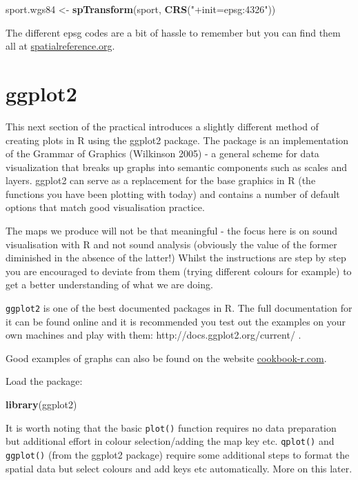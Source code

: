 \documentclass[]{article}
\newenvironment{Shaded}{}{}
\newcommand{\KeywordTok}[1]{\textcolor[rgb]{0.00,0.44,0.13}{\textbf{{#1}}}}
\newcommand{\StringTok}[1]{\textcolor[rgb]{0.25,0.44,0.63}{{#1}}}
\newcommand{\NormalTok}[1]{{#1}}
\begin{document}
\begin{Shaded}
\begin{Highlighting}[]
\NormalTok{sport.wgs84 <- }\KeywordTok{spTransform}\NormalTok{(sport, }\KeywordTok{CRS}\NormalTok{(}\StringTok{"+init=epsg:4326"}\NormalTok{))}
\end{Highlighting}
\end{Shaded}
The different epsg codes are a bit of hassle to remember but you can
find them all at
\href{http://spatialreference.org/}{spatialreference.org}.

\section{ggplot2}

This next section of the practical introduces a slightly different
method of creating plots in R using the ggplot2 package. The package is
an implementation of the Grammar of Graphics (Wilkinson 2005) - a
general scheme for data visualization that breaks up graphs into
semantic components such as scales and layers. ggplot2 can serve as a
replacement for the base graphics in R (the functions you have been
plotting with today) and contains a number of default options that match
good visualisation practice.

The maps we produce will not be that meaningful - the focus here is on
sound visualisation with R and not sound analysis (obviously the value
of the former diminished in the absence of the latter!) Whilst the
instructions are step by step you are encouraged to deviate from them
(trying different colours for example) to get a better understanding of
what we are doing.

\texttt{ggplot2} is one of the best documented packages in R. The full
documentation for it can be found online and it is recommended you test
out the examples on your own machines and play with them:
http://docs.ggplot2.org/current/ .

Good examples of graphs can also be found on the website
\href{http://www.cookbook-r.com/Graphs/}{cookbook-r.com}.

Load the package:

\begin{Shaded}
\begin{Highlighting}[]
\KeywordTok{library}\NormalTok{(ggplot2)}
\end{Highlighting}
\end{Shaded}
It is worth noting that the basic \texttt{plot()} function requires no
data preparation but additional effort in colour selection/adding the
map key etc. \texttt{qplot()} and \texttt{ggplot()} (from the ggplot2
package) require some additional steps to format the spatial data but
select colours and add keys etc automatically. More on this later.
\end{document}
